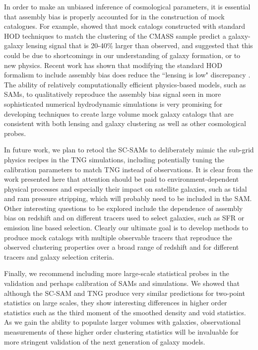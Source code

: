 \documentclass[fleqn,usenatbib]{mnras}
\begin{document}
In order to make an unbiased inference of cosmological parameters, it is essential that assembly bias is properly accounted for in the construction of mock catalogues. For example, \citet{2017MNRAS.467.3024L} showed that mock catalogs constructed with standard HOD techniques to match the clustering of the CMASS sample predict a galaxy-galaxy lensing signal that is 20-40\% larger than observed, and suggested that this could be due to shortcomings in our understanding of galaxy formation, or to new physics. Recent work has shown that modifying the standard HOD formalism to include assembly bias does reduce the ``lensing is low" discrepancy \citep[e.g.][]{2021MNRAS.502.3582Y,2021MNRAS.502.2074L,2020arXiv201001143Z}. The ability of relatively computationally efficient physics-based models, such as SAMs, to qualitatively reproduce the assembly bias signal seen in more sophisticated numerical hydrodynamic simulations is very promising for developing techniques to create large volume mock galaxy catalogs that are consistent with both lensing and galaxy clustering as well as other cosmological probes. 

In future work, we plan to retool the SC-SAMs to deliberately mimic the sub-grid physics recipes in the TNG simulations, including potentially tuning the calibration parameters to match TNG instead of observations. It is clear from the work presented here that attention should be paid to environment-dependent physical processes and especially their impact on satellite galaxies, such as tidal and ram pressure stripping, which will probably need to be included in the SAM. Other interesting questions to be explored include the dependence of assembly bias on redshift and on different tracers used to select galaxies, such as SFR or emission line based selection. Clearly our ultimate goal is to develop methods to produce mock catalogs with multiple observable tracers that reproduce the observed clustering properties over a broad range of redshift and for different tracers and galaxy selection criteria.

Finally, we recommend including more large-scale statistical probes in the validation and perhaps calibration of SAMs and simulations. We showed that although the SC-SAM and TNG produce very similar predictions for two-point statistics on large scales, they show interesting differences in higher order statistics such as the third moment of the smoothed density and void statistics. As we gain the ability to populate larger volumes with galaxies, observational measurements of these higher order clustering statistics will be invaluable for more stringent validation of the next generation of galaxy models. 
\end{document}
